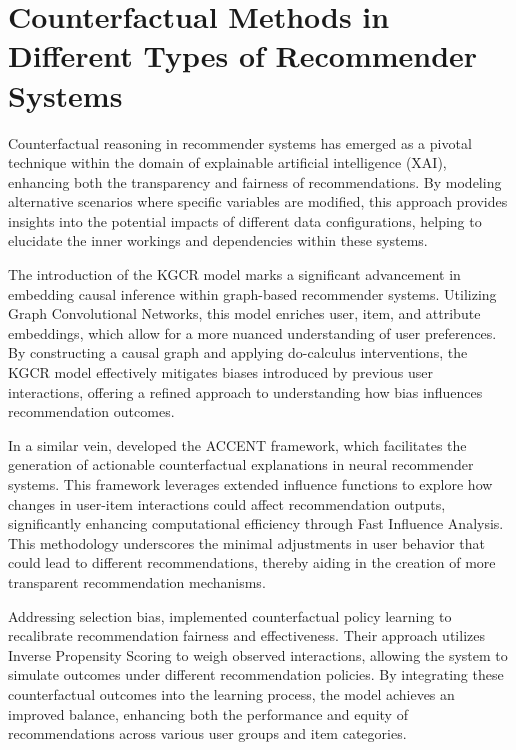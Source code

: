 \section{Counterfactual Methods in Different Types of Recommender Systems}

Counterfactual reasoning in recommender systems has emerged as a pivotal
technique within the domain of explainable artificial intelligence (XAI), enhancing
both the transparency and fairness of recommendations. By modeling alternative
scenarios where specific variables are modified, this approach provides insights
into the potential impacts of different data configurations, helping to
elucidate the inner workings and dependencies within these systems.

The introduction of the KGCR model \parencite{wei_causal_2023} marks a significant advancement
in embedding causal inference within graph-based recommender systems. Utilizing
Graph Convolutional Networks, this model enriches user, item, and attribute embeddings,
which allow for a more nuanced understanding of user preferences. By constructing
a causal graph and applying do-calculus interventions, the KGCR model
effectively mitigates biases introduced by previous user interactions, offering a
refined approach to understanding how bias influences recommendation outcomes.

In a similar vein, \textcite{tran_counterfactual_2021} developed the ACCENT framework, which
facilitates the generation of actionable counterfactual explanations in neural
recommender systems. This framework leverages extended influence functions to explore
how changes in user-item interactions could affect recommendation outputs,
significantly enhancing computational efficiency through Fast Influence Analysis.
This methodology underscores the minimal adjustments in user behavior that could
lead to different recommendations, thereby aiding in the creation of more
transparent recommendation mechanisms.

Addressing selection bias, \parencite{liu_practical_2022} implemented counterfactual policy
learning to recalibrate recommendation fairness and effectiveness. Their approach
utilizes Inverse Propensity Scoring to weigh observed interactions, allowing the
system to simulate outcomes under different recommendation policies. By integrating
these counterfactual outcomes into the learning process, the model achieves an
improved balance, enhancing both the performance and equity of recommendations across
various user groups and item categories.

